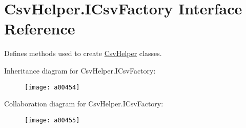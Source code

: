 \hypertarget{a00112}{\section{Csv\-Helper.\-I\-Csv\-Factory Interface Reference}
\label{a00112}
}


Defines methods used to create \hyperlink{a00337}{Csv\-Helper} classes.  




Inheritance diagram for Csv\-Helper.\-I\-Csv\-Factory\-:
\nopagebreak
\begin{figure}[H]
\begin{center}
\leavevmode
\texttt{[image: a00454]}
\end{center}
\end{figure}


Collaboration diagram for Csv\-Helper.\-I\-Csv\-Factory\-:
\nopagebreak
\begin{figure}[H]
\begin{center}
\leavevmode
\texttt{[image: a00455]}
\end{center}
\end{figure}
